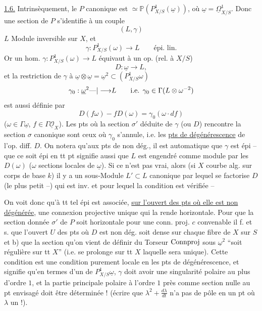 \uline{1.6.} Intrinsèquement, le $P$ canonique est $\simeq\mathbb{P}(P^1_{X/S}(\underline{\omega}))$, où $\underline{\omega}=\underline{\Omega}^1_{X/S}$. Donc une section de $P$ s'identifie à un couple
\[
(L,\gamma)
\]
$L$ Module inversible sur $X$, et
\[
\gamma:P^1_{X/S}(\omega)\longrightarrow L\qquad\text{épi. lin.}
\]
Or un hom.  $\gamma:P^1_{X/S}(\omega)\longrightarrow L$ équivaut à
un op.  (rel. à $X/S$)
\[
D:\underline{\omega}\longrightarrow L,
\]
et la restriction de $\gamma$ à $\underline{\omega}\otimes\underline{\omega}=\underline{\omega}^2\subset(P^1_{X/S}\omega)$
\[
\gamma_0:\underline{\omega}^2{\text{---}|\longrightarrow}L\qquad\text{i.e. }\gamma_0\in\Gamma(L\otimes\omega^{-2})
\]
est aussi définie par
\[
D(f\omega)-fD(\omega)=\gamma_0(\omega\cdot df)
\]
($\omega\in\Gamma\underline{\omega}$, $f\in\Gamma\underline{\mathcal{O}}_X$). Les pts où la section $\sigma'$ déduite de $\gamma$ (ou $D$) rencontre la section $\sigma$ canonique sont ceux où $\gamma_0$ s'annule, i.e. les \uline{pts de dégénérescence} de l'op. diff. $D$. On notera qu'aux pts de non dég., il est automatique que $\gamma$ est épi -- que ce soit épi en tt pt signifie aussi que $L$ est engendré comme module par les $D(\omega)$ ($\omega$ sections locales de $\underline{\omega}$). Si ce n'est pas vrai, alors (si $X$ courbe alg. sur corps de base $k$) il y a un sous-Module $L'\subset L$ canonique par lequel se factorise $D$ (le plus petit --) qui est inv. et pour lequel la condition est vérifiée --

On voit donc qu'à tt tel épi est associée, \uline{sur l'ouvert des pts où elle est non dégénérée}, une connexion projective  unique qui la rende horizontale. 
Pour que la section donnée $\sigma'$ de $P$ soit horizontale pour une conn. proj. $c$ convenable il f. et s.  que l'ouvert $U$ des pts où $D$ est non dég. soit dense sur chaque fibre de $X$ sur $S$ et b) que la section qu'on vient de définir  du Torseur ${\operatorname{Connproj}}$ sous $\underline{\omega}^2$  ``soit régulière sur tt $X$'' (i.e. se prolonge  sur tt $X$ laquelle sera unique). Cette condition est une condition purement locale en les pts de   dégénérescence, et signifie qu'en termes d'un  de $P^1_{X/S}\underline{\omega}$, $\gamma$  doit avoir une singularité polaire au plus d'ordre $1$, et la partie   principale polaire à l'ordre $1$ près comme section nulle au pt envisagé doit être déterminée ! (écrire que $\lambda^2+\frac{d\lambda}{dt}$ n'a pas de pôle en un pt où $\lambda$  un !).

